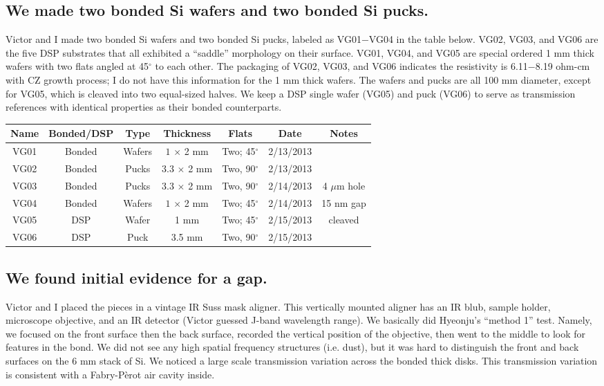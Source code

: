 \subsection{We made two bonded Si wafers and two bonded Si pucks.}

Victor and I made two bonded Si wafers and two bonded Si pucks, labeled as VG01$-$VG04 in the table below.  VG02, VG03, and VG06 are the five DSP substrates that all exhibited a ``saddle'' morphology on their surface.  VG01, VG04, and VG05 are special ordered 1 mm thick wafers with two flats angled at 45$^\circ$ to each other.  The packaging of VG02, VG03, and VG06 indicates the resistivity is 6.11$-$8.19 ohm-cm with CZ growth process; I do not have this information for the 1 mm thick wafers.  The wafers and pucks are all 100 mm diameter, except for VG05, which is cleaved into two equal-sized halves.  We keep a DSP single wafer (VG05) and puck (VG06) to serve as transmission references with identical properties as their bonded counterparts.

\begin{center}
    \begin{tabular}{ c c c c c c c}
    \hline
    Name & Bonded/DSP & Type & Thickness & Flats & Date & Notes \\ 
        \hline
    VG01 & Bonded & Wafers & $1$ $\times$ 2 mm & Two; 45$^\circ$ & 2/13/2013 &  \\
    VG02 & Bonded & Pucks & $3.3$ $\times$ 2 mm & Two, 90$^\circ$  & 2/13/2013 &  \\
    VG03 & Bonded & Pucks & $3.3$ $\times$ 2 mm & Two, 90$^\circ$ & 2/14/2013 & 4 $\mu$m hole \\    
    VG04 & Bonded & Wafers & $1$ $\times$ 2 mm &  Two; 45$^\circ$ & 2/14/2013 & 15 nm gap \\        
    VG05 & DSP & Wafer & 1 mm &  Two; 45$^\circ$ & 2/15/2013 & cleaved  \\
    VG06 & DSP & Puck & 3.5 mm &  Two, 90$^\circ$ & 2/15/2013 & \\
    \hline
    \end{tabular}
\end{center}

\subsection{We found initial evidence for a gap.}

Victor and I placed the pieces in a vintage IR Suss mask aligner. This vertically mounted aligner has an IR blub, sample holder, microscope objective, and an IR detector (Victor guessed J-band wavelength range).  We basically did Hyeonju's ``method 1'' test. Namely, we focused on the front surface then the back surface, recorded the vertical position of the objective, then went to the middle to look for features in the bond.  We did not see any high spatial frequency structures (i.e. dust), but it was hard to distinguish the front and back surfaces on the 6 mm stack of Si. We noticed a large scale transmission variation across the bonded thick disks.  This transmission variation is consistent with a Fabry-P\`{e}rot air cavity inside.

